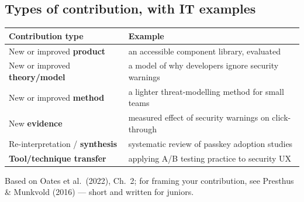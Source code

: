 \documentclass[11pt,a4paper,british,twoside=false,headings=small,chapterprefix=false,numbers=noenddot]{scrbook}
\begin{document}
\subsection{Types of contribution, with IT examples}
\begin{center}\small
\small
  \renewcommand{\arraystretch}{1.28}
  \begin{tabular}{@{}p{4.0cm}p{9.3cm}@{}}
    \toprule
    \textbf{Contribution type} & \textbf{Example}\\
    \midrule
    New or improved \textbf{product} & an accessible component library, evaluated\\
    New or improved \textbf{theory/model} & a model of why developers ignore security warnings\\
    New or improved \textbf{method} & a lighter threat-modelling method for small teams\\
    New \textbf{evidence} & measured effect of security warnings on click-through\\
    Re-interpretation / \textbf{synthesis} & systematic review of passkey adoption studies\\
    \textbf{Tool/technique transfer} & applying A/B testing practice to security UX\\
    \bottomrule
  \end{tabular}
  

  {\color{kgrey}\small Based on Oates et al.\ (2022), Ch.\ 2; for framing your
  contribution, see Presthus \& Munkvold (2016) --- short and written for juniors.}
\end{center}
\end{document}
